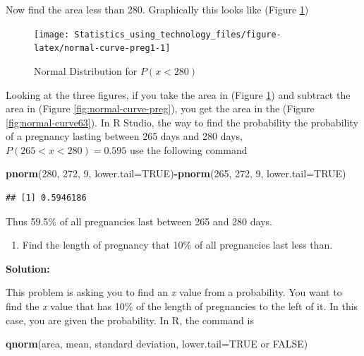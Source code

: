 \documentclass[
]{book}
\newenvironment{Shaded}{\begin{snugshade}}{\end{snugshade}}
\newcommand{\DataTypeTok}[1]{\textcolor[rgb]{0.13,0.29,0.53}{#1}}
\newcommand{\DecValTok}[1]{\textcolor[rgb]{0.00,0.00,0.81}{#1}}
\newcommand{\KeywordTok}[1]{\textcolor[rgb]{0.13,0.29,0.53}{\textbf{#1}}}
\newcommand{\NormalTok}[1]{#1}
\newcommand{\OperatorTok}[1]{\textcolor[rgb]{0.81,0.36,0.00}{\textbf{#1}}}
\newcommand{\OtherTok}[1]{\textcolor[rgb]{0.56,0.35,0.01}{#1}}
\providecommand{\tightlist}{%
  \setlength{\itemsep}{0pt}\setlength{\parskip}{0pt}}
\begin{document}
Now find the area less than 280. Graphically this looks like (Figure \ref{fig:normal-curve-preg1})



\begin{figure}
\texttt{[image: Statistics\_using\_technology\_files/figure-latex/normal-curve-preg1-1]} \caption{Normal Distribution for \(P(x<280)\)}\label{fig:normal-curve-preg1}
\end{figure}

Looking at the three figures, if you take the area in (Figure \ref{fig:normal-curve-preg1}) and subtract the area in (Figure \ref{fig:normal-curve-preg}), you get the area in the (Figure \ref{fig:normal-curve63}). In R Studio, the way to find the probability the probability of a pregnancy lasting between 265 days and 280 days, \(P(265<x<280)=0.595\) use the following command

\begin{Shaded}
\begin{Highlighting}[]
\KeywordTok{pnorm}\NormalTok{(}\DecValTok{280}\NormalTok{, }\DecValTok{272}\NormalTok{, }\DecValTok{9}\NormalTok{, }\DataTypeTok{lower.tail=}\OtherTok{TRUE}\NormalTok{)}\OperatorTok{-}\KeywordTok{pnorm}\NormalTok{(}\DecValTok{265}\NormalTok{, }\DecValTok{272}\NormalTok{, }\DecValTok{9}\NormalTok{, }\DataTypeTok{lower.tail=}\OtherTok{TRUE}\NormalTok{)}
\end{Highlighting}
\end{Shaded}

\begin{verbatim}
## [1] 0.5946186
\end{verbatim}

Thus 59.5\% of all pregnancies last between 265 and 280 days.

\begin{enumerate}
\def\labelenumi{\alph{enumi}.}
\setcounter{enumi}{4}
\tightlist
\item
  Find the length of pregnancy that 10\% of all pregnancies last less than.
\end{enumerate}

\textbf{Solution:}

This problem is asking you to find an \emph{x} value from a probability. You want to find the \emph{x} value that has 10\% of the length of pregnancies to the left of it. In this case, you are given the probability. In R, the command is

\begin{Shaded}
\begin{Highlighting}[]
\KeywordTok{qnorm}\NormalTok{(area, mean, standard deviation, }\DataTypeTok{lower.tail=}\OtherTok{TRUE}\NormalTok{ or }\OtherTok{FALSE}\NormalTok{)}
\end{Highlighting}
\end{Shaded}
\end{document}

